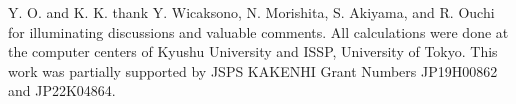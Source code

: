 \documentclass[journal=acsodf,manuscript=article]{achemso}
\begin{document}
\begin{acknowledgement}
Y. O. and K. K. thank Y. Wicaksono, N. Morishita, S. Akiyama, and R. Ouchi for illuminating discussions and valuable comments. All calculations were done at the computer centers of Kyushu University and ISSP, University of Tokyo. This work was partially supported by JSPS KAKENHI Grant Numbers JP19H00862 and JP22K04864.
\end{acknowledgement}


\end{document}
